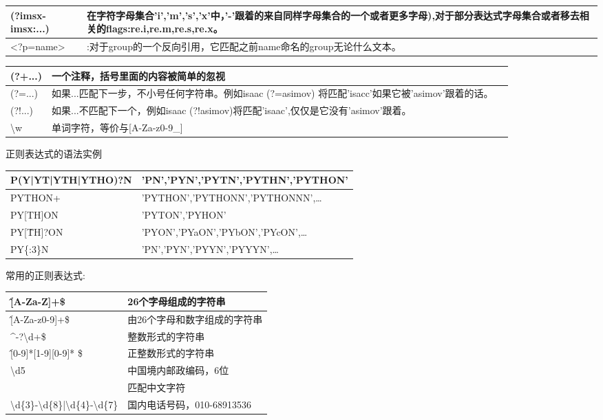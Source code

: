 \documentclass{book}
\begin{document}
\begin{table}
\begin{tabular}{|p{2cm}|p{8cm}|}
\hline
(?imsx-imsx:...)&在字符字母集合'i','m','s','x'中，'-'跟着的来自同样字母集合的一个或者更多字母),对于部分表达式字母集合或者移去相关的flags:re.i,re.m,re.s,re.x。\\
\hline
<?p=name>&:对于group的一个反向引用，它匹配之前name命名的group无论什么文本。\\
\hline
\end{tabular}
\end{table}
\begin{tabular}{|p{2cm}|p{4cm}|p{4cm}|}
\hline
(?+...)&一个注释，括号里面的内容被简单的忽视&\\
\hline
(?=...)&如果...匹配下一步，不小号任何字符串。例如isaac (?=asimov) 将匹配'isacc'如果它被'asimov'跟着的话。&\\
\hline
(?!...)&如果...不匹配下一个，例如isaac (?!asimov)将匹配'isaac',仅仅是它没有'asimov'跟着。&\\
\hline
\textbackslash w&单词字符，等价与[A-Za-z0-9\_]&\\
\hline
\end{tabular}
正则表达式的语法实例
\begin{center}
\begin{tabular}{|p{6cm}|p{8cm}|}
\hline
P(Y|YT|YTH|YTHO)?N&'PN','PYN','PYTN','PYTHN','PYTHON'\\
\hline
PYTHON+&'PYTHON','PYTHONN','PYTHONNN',\ldots\\
\hline
PY[TH]ON&'PYTON','PYHON'\\
\hline
PY[\^TH]?ON&'PYON','PYaON','PYbON','PYcON',\ldots\\
\hline
PY\{:3\}N&'PN','PYN','PYYN','PYYYN',\ldots\\
\hline
\end{tabular}
\end{center}
常用的正则表达式:
\begin{center}
\begin{tabular}{|l|l|}
\hline
\^[A-Za-Z]+\$ &26个字母组成的字符串\\
\hline
\^[A-Za-z0-9]+\$&由26个字母和数字组成的字符串\\
\hline
\^\quad-?\textbackslash d+\$&整数形式的字符串\\
\hline
\^[0-9]*[1-9][0-9]* \$&正整数形式的字符串\\
\hline
[1-9]\textbackslash d{5}&中国境内邮政编码，6位\\
\hline
[\textbackslash u4e00-\textbackslash u9fa5]&匹配中文字符\\
\hline
\textbackslash d\{3\}-\textbackslash d\{8\}|\textbackslash d\{4\}-\textbackslash d\{7\}&国内电话号码，010-68913536\\
\hline

\end{tabular}
\end{center}
\end{document}
